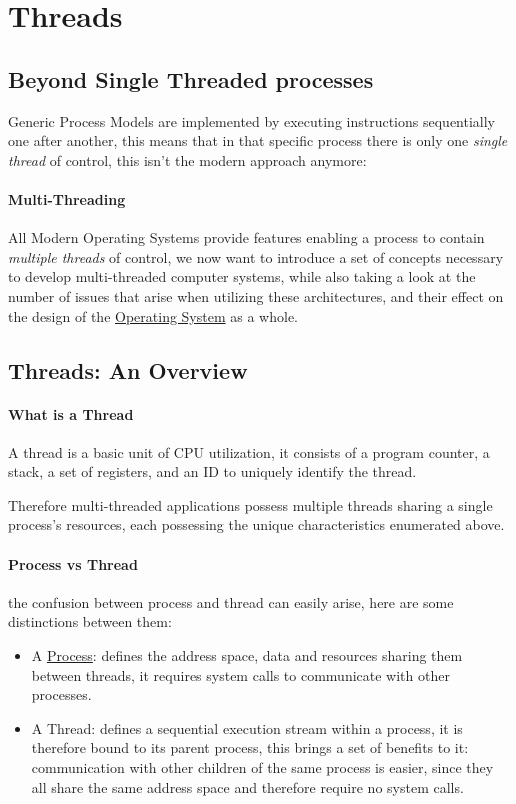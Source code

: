 \documentclass[openright, twoside]{report}
\theoremstyle{definition}
\theoremstyle{example}
\begin{document}
	\section{Threads}
	\label{sec:threads}
		\subsection{Beyond Single Threaded processes}
		Generic Process Models are implemented by executing instructions 
		sequentially one after another, this means that in that specific 
		process there is only one \emph{single thread} of control, this 
		isn't the modern approach anymore:

			\paragraph{Multi-Threading}
			All Modern Operating Systems provide features enabling a process 
			to contain \emph{multiple threads} of control, we now want to
			introduce a set of concepts necessary to develop multi-threaded 
			computer systems, while also taking a look at the number of issues 
			that arise when utilizing these architectures, and their effect on 
			the design of the \hyperref[sec:OS]{Operating System} as a whole.

		\subsection{Threads: An Overview}
			\paragraph{What is a Thread}
			A thread is a basic unit of CPU utilization, it consists of a 
			program counter, a stack, a set of registers, and an ID to 
			uniquely identify the thread.

			Therefore multi-threaded applications possess multiple threads 
			sharing a single process's resources, each possessing the unique 
			characteristics enumerated above. 

			\paragraph{Process vs Thread}
			the confusion between process and thread can easily arise, here 
			are some distinctions between them:
			\begin{itemize}
				\item A \hyperref[ssec:proc]{Process}: defines the address space, data and resources
				sharing them between threads, it requires system calls to 
				communicate with other processes.
				\item A Thread: defines a sequential execution stream within
				a process, it is therefore bound to its parent process, this 
				brings a set of benefits to it: communication with other 
				children of the same process is easier, since they all share 
				the same address space and therefore require no system calls. 
			\end{itemize}
\end{document}
